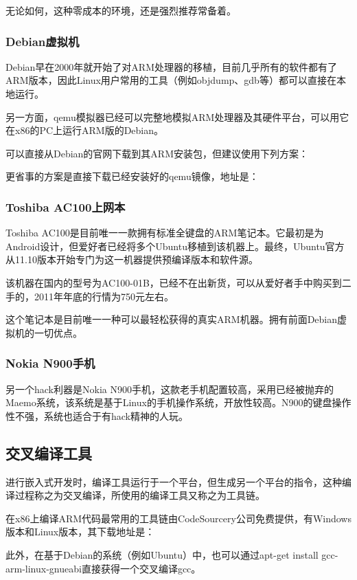 无论如何，这种零成本的环境，还是强烈推荐常备着。
\subsubsection{Debian虚拟机}
Debian早在2000年就开始了对ARM处理器的移植，目前几乎所有的软件都有了ARM版本，因此Linux用户常用的工具（例如objdump、gdb等）都可以直接在本地运行。

另一方面，qemu模拟器已经可以完整地模拟ARM处理器及其硬件平台，可以用它在x86的PC上运行ARM版的Debian。

可以直接从Debian的官网下载到其ARM安装包，但建议使用下列方案：

更省事的方案是直接下载已经安装好的qemu镜像，地址是：
\subsubsection{Toshiba AC100上网本}
Toshiba AC100是目前唯一一款拥有标准全键盘的ARM笔记本。它最初是为Android设计，但爱好者已经将多个Ubuntu移植到该机器上。最终，Ubuntu官方从11.10版本开始专门为这一机器提供预编译版本和软件源。

该机器在国内的型号为AC100-01B，已经不在出新货，可以从爱好者手中购买到二手的，2011年年底的行情为750元左右。

这个笔记本是目前唯一一种可以最轻松获得的真实ARM机器。拥有前面Debian虚拟机的一切优点。
\subsubsection{Nokia N900手机}
另一个hack利器是Nokia N900手机，这款老手机配置较高，采用已经被抛弃的Maemo系统，该系统是基于Linux的手机操作系统，开放性较高。N900的键盘操作性不强，系统也适合于有hack精神的人玩。
\subsection{交叉编译工具}
进行嵌入式开发时，编译工具运行于一个平台，但生成另一个平台的指令，这种编译过程称之为交叉编译，所使用的编译工具又称之为工具链。

在x86上编译ARM代码最常用的工具链由CodeSourcery公司免费提供，有Windows版本和Linux版本，其下载地址是：

此外，在基于Debian的系统（例如Ubuntu）中，也可以通过apt-get install gcc-arm-linux-gnueabi直接获得一个交叉编译gcc。

